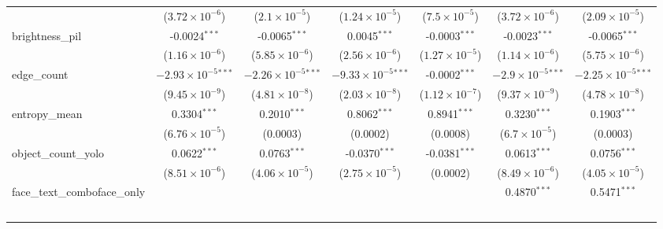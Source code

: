 \begin{table}[htbp]
\begin{tabular}{lcccccc}
                                     & ($3.72\times 10^{-6}$)         & ($2.1\times 10^{-5}$)          & ($1.24\times 10^{-5}$)         & ($7.5\times 10^{-5}$)          & ($3.72\times 10^{-6}$)        & ($2.09\times 10^{-5}$)\\    
      brightness\_pil                & -0.0024$^{***}$                & -0.0065$^{***}$                & 0.0045$^{***}$                 & -0.0003$^{***}$                & -0.0023$^{***}$               & -0.0065$^{***}$\\   
                                     & ($1.16\times 10^{-6}$)         & ($5.85\times 10^{-6}$)         & ($2.56\times 10^{-6}$)         & ($1.27\times 10^{-5}$)         & ($1.14\times 10^{-6}$)        & ($5.75\times 10^{-6}$)\\    
      edge\_count                    & $-2.93\times 10^{-5}$$^{***}$  & $-2.26\times 10^{-5}$$^{***}$  & $-9.33\times 10^{-5}$$^{***}$  & -0.0002$^{***}$                & $-2.9\times 10^{-5}$$^{***}$  & $-2.25\times 10^{-5}$$^{***}$\\    
                                     & ($9.45\times 10^{-9}$)         & ($4.81\times 10^{-8}$)         & ($2.03\times 10^{-8}$)         & ($1.12\times 10^{-7}$)         & ($9.37\times 10^{-9}$)        & ($4.78\times 10^{-8}$)\\    
      entropy\_mean                  & 0.3304$^{***}$                 & 0.2010$^{***}$                 & 0.8062$^{***}$                 & 0.8941$^{***}$                 & 0.3230$^{***}$                & 0.1903$^{***}$\\   
                                     & ($6.76\times 10^{-5}$)         & (0.0003)                       & (0.0002)                       & (0.0008)                       & ($6.7\times 10^{-5}$)         & (0.0003)\\   
      object\_count\_yolo            & 0.0622$^{***}$                 & 0.0763$^{***}$                 & -0.0370$^{***}$                & -0.0381$^{***}$                & 0.0613$^{***}$                & 0.0756$^{***}$\\   
                                     & ($8.51\times 10^{-6}$)         & ($4.06\times 10^{-5}$)         & ($2.75\times 10^{-5}$)         & (0.0002)                       & ($8.49\times 10^{-6}$)        & ($4.05\times 10^{-5}$)\\    
      face\_text\_comboface\_only    &                                &                                &                                &                                & 0.4870$^{***}$                & 0.5471$^{***}$\\   
$$
\end{tabular}
\end{table}
